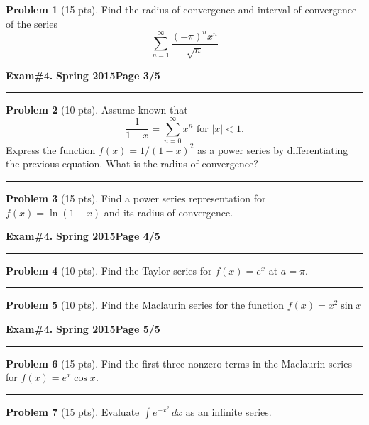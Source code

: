 \documentclass[12pt]{article}
\theoremstyle{definition}
\newtheorem{problem}{Problem}
\begin{document}
\begin{problem}[15 pts]
Find the radius of convergence and interval of convergence of the series 
\begin{equation*}
\sum_{n=1}^\infty \frac{(-\pi)^n x^n}{\sqrt{n}}
\end{equation*}
\end{problem}


\newpage


\hfill{\large\bf Exam\#4.}\hfill{\large\bf
  Spring 2015}\hfill{\large\bf Page 3/5}\hrule

\bigskip
\begin{problem}[10 pts]
Assume known that 
\begin{equation*}
\frac{1}{1-x} = \sum_{n=0}^\infty x^n \text{ for } \lvert x \rvert <1.
\end{equation*}
Express the function $f(x)=1/(1-x)^2$ as a power series by differentiating the previous equation.  What is the radius of convergence?
\vspace{8cm}
\end{problem}
\hrule

\begin{problem}[15 pts]
Find a power series representation for $f(x) = \ln(1-x)$ and its radius of convergence.
\end{problem}
\newpage

\hfill{\large\bf Exam\#4.}\hfill{\large\bf
  Spring 2015}\hfill{\large\bf Page 4/5}\hrule

\bigskip

\begin{problem}[10 pts]
Find the Taylor series for $f(x) = e^x$ at $a=\pi$.
\vspace{10cm}
\end{problem}
\hrule

\begin{problem}[10 pts]
Find the Maclaurin series for the function $f(x) = x^2 \sin x$
\end{problem}
\newpage

\hfill{\large\bf Exam\#4.}\hfill{\large\bf
  Spring 2015}\hfill{\large\bf Page 5/5}\hrule
  
\bigskip
\begin{problem}[15 pts]
Find the first three nonzero terms in the Maclaurin series for $f(x)=e^x\cos x$.
\vspace{10cm}
\end{problem}
\hrule

\begin{problem}[15 pts]
Evaluate $\int e^{-x^2}\, dx$ as an infinite series.
\end{problem}
\end{document}
